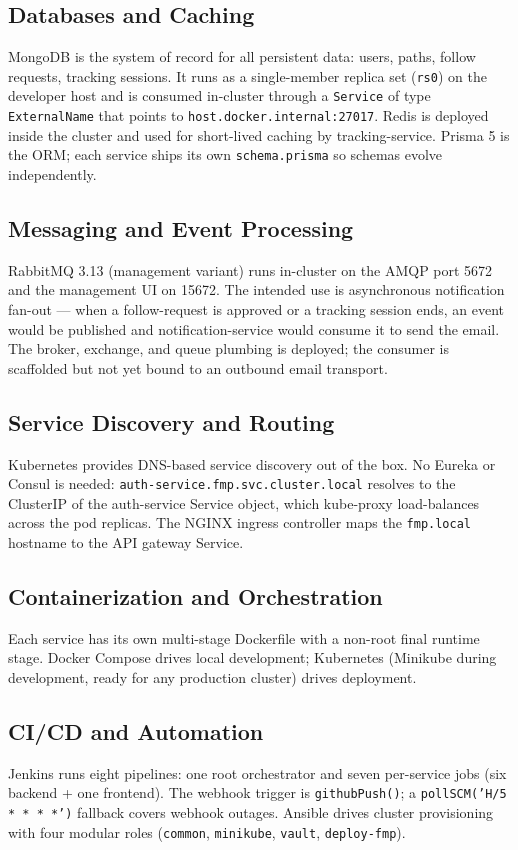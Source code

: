 \documentclass[11pt,a4paper]{article}
\begin{document}
\subsection{Databases and Caching}
MongoDB is the system of record for all persistent data: users,
paths, follow requests, tracking sessions.  It runs as a single-member
replica set (\texttt{rs0}) on the developer host and is consumed
in-cluster through a \texttt{Service} of type \texttt{ExternalName}
that points to \texttt{host.docker.internal:27017}.  Redis is deployed
inside the cluster and used for short-lived caching by
tracking-service.  Prisma 5 is the ORM; each service ships its own
\texttt{schema.prisma} so schemas evolve independently.

\subsection{Messaging and Event Processing}
RabbitMQ 3.13 (management variant) runs in-cluster on the AMQP port
5672 and the management UI on 15672.  The intended use is asynchronous
notification fan-out — when a follow-request is approved or a tracking
session ends, an event would be published and notification-service
would consume it to send the email.  The broker, exchange, and queue
plumbing is deployed; the consumer is scaffolded but not yet bound to
an outbound email transport.

\subsection{Service Discovery and Routing}
Kubernetes provides DNS-based service discovery out of the box.  No
Eureka or Consul is needed: \texttt{auth-service.fmp.svc.cluster.local}
resolves to the ClusterIP of the auth-service Service object, which
kube-proxy load-balances across the pod replicas.  The NGINX ingress
controller maps the \texttt{fmp.local} hostname to the API gateway
Service.

\subsection{Containerization and Orchestration}
Each service has its own multi-stage Dockerfile with a non-root final
runtime stage.  Docker Compose drives local development; Kubernetes
(Minikube during development, ready for any production cluster) drives
deployment.

\subsection{CI/CD and Automation}
Jenkins runs eight pipelines: one root orchestrator and seven
per-service jobs (six backend + one frontend).  The webhook trigger
is \texttt{githubPush()}; a \texttt{pollSCM('H/5 * * * *')} fallback
covers webhook outages.  Ansible drives cluster provisioning with
four modular roles (\texttt{common}, \texttt{minikube},
\texttt{vault}, \texttt{deploy-fmp}).
\end{document}

